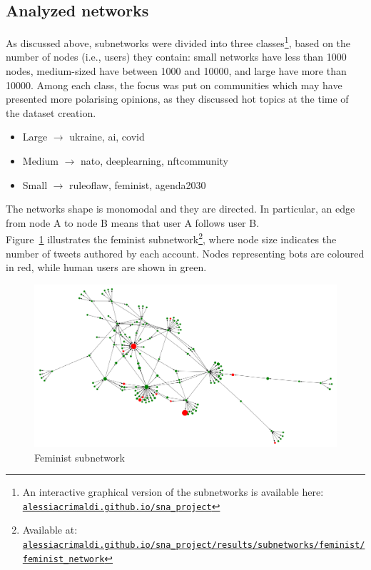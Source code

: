 \documentclass[12pt, a4paper]{article}
\begin{document}
	\subsection{Analyzed networks}
    	As discussed above, subnetworks were divided into three classes\footnote{An interactive graphical version of the subnetworks is available here:\\ \href{https://alessiacrimaldi.github.io/sna_project}{\texttt{alessiacrimaldi.github.io/sna\_project}}}, based on the number of nodes (i.e., users) they contain: small networks have less than 1000 nodes, medium-sized have between 1000 and 10000, and large have more than 10000. Among each class, the focus was put on communities which may have presented more polarising opinions, as they discussed hot topics at the time of the dataset creation.
    	\begin{itemize}
			\item Large $\rightarrow$ ukraine, ai, covid
			\item Medium $\rightarrow$ nato, deeplearning, nftcommunity
			\item Small $\rightarrow$ ruleoflaw, feminist, agenda2030
		\end{itemize}
		The networks shape is monomodal and they are directed. In particular, an edge from node A to node B means that user A follows user B.\\
		
		Figure~\ref{fig:feminist_subnetwork} illustrates the feminist subnetwork\footnote{Available at:\\ \href{https://alessiacrimaldi.github.io/sna_project/results/subnetworks/feminist/feminist_network}{\texttt{alessiacrimaldi.github.io/sna\_project/results/subnetworks/feminist/feminist\_network}}}, where node size indicates the number of tweets authored by each account. Nodes representing bots are coloured in red, while human users are shown in green.
		\begin{figure}[H]
    		\centering
    		\includegraphics[width=\textwidth]{feminist_subnetwork.png}
    		\caption{Feminist subnetwork}
    		\label{fig:feminist_subnetwork}
		\end{figure}
		
\end{document}
